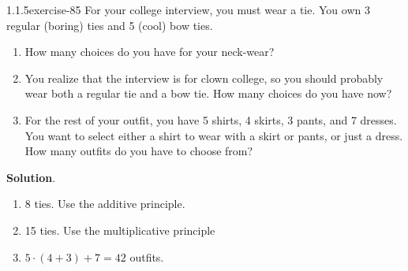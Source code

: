 \documentclass[twoside,11pt,]{book}
\numberwithin{equation}{chapter}
\begin{document}
\begin{divisionsolution}{1.1.5}{}{exercise-85}%
\hypertarget{p-1335}{}%
For your college interview, you must wear a tie. You own 3 regular (boring) ties and 5 (cool) bow ties.\leavevmode%
\begin{enumerate}[label=(\alph*)]
\item\hypertarget{li-998}{}\hypertarget{p-1336}{}%
How many choices do you have for your neck-wear?%
\item\hypertarget{li-999}{}\hypertarget{p-1338}{}%
You realize that the interview is for clown college, so you should probably wear both a regular tie and a bow tie. How many choices do you have now?%
\item\hypertarget{li-1000}{}\hypertarget{p-1340}{}%
For the rest of your outfit, you have 5 shirts, 4 skirts, 3 pants, and 7 dresses. You want to select either a shirt to wear with a skirt or pants, or just a dress. How many outfits do you have to choose from?%
\end{enumerate}
%
\par\smallskip%
\noindent\textbf{Solution}.\quad%
\hypertarget{p-1342}{}%
\leavevmode%
\begin{enumerate}[label=(\alph*)]
\item\hypertarget{li-1001}{}\hypertarget{p-1343}{}%
8 ties. Use the additive principle.%
\item\hypertarget{li-1002}{}\hypertarget{p-1344}{}%
15 ties. Use the multiplicative principle%
\item\hypertarget{li-1003}{}\hypertarget{p-1345}{}%
\(5\cdot (4+3) + 7 = 42\) outfits.%
\end{enumerate}
%
\end{divisionsolution}%
\end{document}
